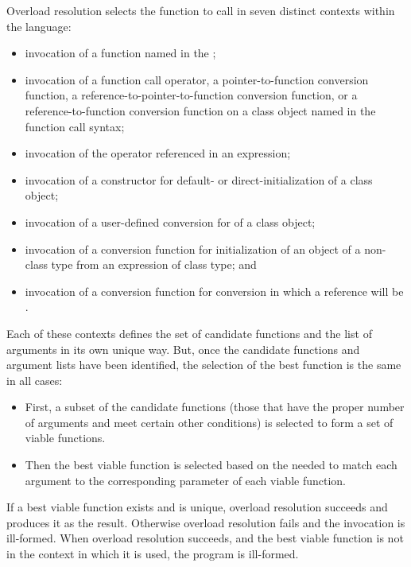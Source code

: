 \pnum
{}%
Overload resolution selects the function to call in seven distinct
contexts within the language:
\begin{itemize}
\item
invocation of a function named in the ;
\item
invocation of a function call operator, a pointer-to-function
conversion function, a reference-to-pointer-to-function conversion
function, or a reference-to-function
conversion function on a class object named in the function
call syntax;
\item
invocation of the operator referenced in an expression;
\item
invocation of a constructor for default- or direct-initialization
of a class object;
\item
invocation of a user-defined conversion for
 of a class object;
\item
invocation of a conversion function for initialization of an object of a
non-class type from an expression of class type; and
\item
invocation of a conversion function for conversion
in which a reference
will be .
\end{itemize}

Each of these contexts defines the set of candidate functions and
the list of arguments in its own unique way.
But, once the
candidate functions and argument lists have been identified, the
selection of the best function is the same in all cases:
\begin{itemize}
\item
First, a subset of the candidate functions (those that have
the proper number of arguments and meet certain other
conditions) is selected to form a set of
%
viable functions.
\item
Then the best viable function is selected based on the
 needed to
match each argument to the corresponding parameter of each
viable function.
\end{itemize}

\pnum
If a best viable function exists and is unique, overload
resolution succeeds and produces it as the result.
Otherwise
overload resolution fails and the invocation is ill-formed.
When overload resolution succeeds,
and the best viable function is not  in the context
in which it is used,
the program is ill-formed.

